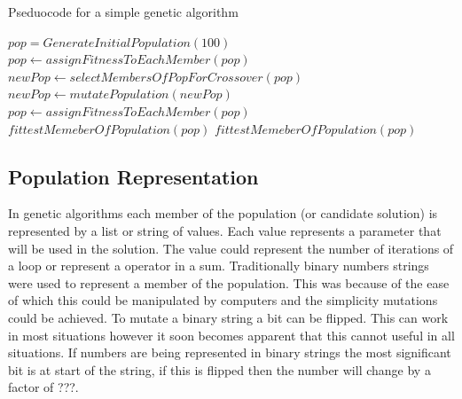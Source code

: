 \documentclass[12pt]{article}
\begin{document}
\begin{algorithm}
\caption{Pseduocode for a simple genetic algorithm}
\label{fig:garun}
\begin{algorithmic}

\State $pop = GenerateInitialPopulation(100)$
\State $pop \gets assignFitnessToEachMember(pop)$
	\State $newPop \gets selectMembersOfPopForCrossover(pop)$
	\State $newPop \gets mutatePopulation(newPop)$
	\State $pop \gets assignFitnessToEachMember(pop)$
		\State \Return $fittestMemeberOfPopulation(pop)$
	\EndIf
\EndWhile
\State \Return $fittestMemeberOfPopulation(pop)$


\end{algorithmic}
\end{algorithm}

\subsection{Population Representation}
In genetic algorithms each member of the population (or candidate solution) is represented by a list or string of values.
Each value represents a parameter that will be used in the solution.
The value could represent the number of iterations of a loop or represent a operator in a sum.
Traditionally binary numbers strings were used to represent a member of the population.
This was because of the ease of which this could be manipulated by computers and the simplicity mutations could be achieved.
To mutate a binary string a bit can be flipped.
This can work in most situations however it soon becomes apparent that this cannot useful in all situations.
If numbers are being represented in binary strings the most significant bit is at start of the string, if this is flipped 
then the number will change by a factor of ???.
\end{document}
